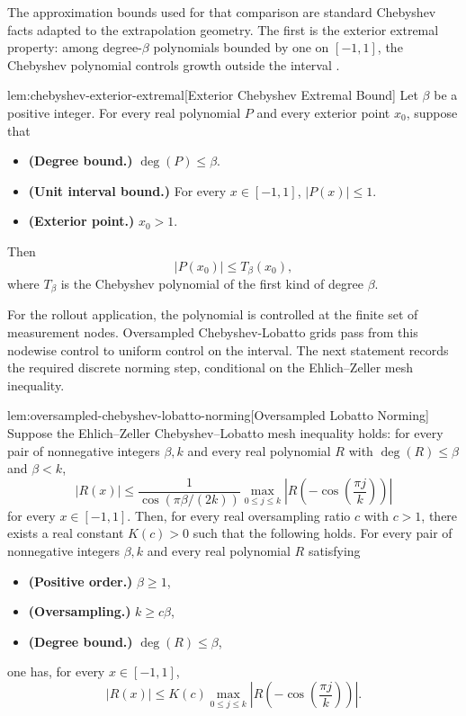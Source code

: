The approximation bounds used for that comparison are standard Chebyshev facts adapted to the extrapolation geometry. The first is the exterior extremal property: among degree-\(\beta\) polynomials bounded by one on \([-1,1]\), the Chebyshev polynomial controls growth outside the interval \citep{karlin1966,pukelsheim1993}.

\begin{lemmav}{lem:chebyshev-exterior-extremal}[Exterior Chebyshev Extremal Bound]
Let $\beta$ be a positive integer. For every real polynomial $P$ and every exterior point $x_0$, suppose that
\begin{itemize}
\item \textbf{(Degree bound.)} $\deg(P)\le \beta$.
\item \textbf{(Unit interval bound.)} For every $x\in[-1,1]$, $|P(x)|\le 1$.
\item \textbf{(Exterior point.)} $x_0>1$.
\end{itemize}
Then
\[
|P(x_0)|\le T_\beta(x_0),
\]
where $T_\beta$ is the Chebyshev polynomial of the first kind of degree $\beta$.
\end{lemmav}

For the rollout application, the polynomial is controlled at the finite set of measurement nodes. Oversampled Chebyshev-Lobatto grids pass from this nodewise control to uniform control on the interval. The next statement records the required discrete norming step, conditional on the Ehlich--Zeller mesh inequality.

\begin{lemmav}{lem:oversampled-chebyshev-lobatto-norming}[Oversampled Lobatto Norming]
Suppose the Ehlich--Zeller Chebyshev--Lobatto mesh inequality holds: for every pair of nonnegative integers $\beta,k$ and every real polynomial $R$ with $\deg(R)\le \beta$ and $\beta<k$,
\[
 |R(x)|
 \le
 \frac{1}{\cos(\pi\beta/(2k))}
 \max_{0\le j\le k}\left|R\!\left(-\cos\!\left(\frac{\pi j}{k}\right)\right)\right|
\]
for every $x\in[-1,1]$.  Then, for every real oversampling ratio $c$ with $c>1$, there exists a real constant $K(c)>0$ such that the following holds.  For every pair of nonnegative integers $\beta,k$ and every real polynomial $R$ satisfying
\begin{itemize}
\item \textbf{(Positive order.)} $\beta\ge 1$,
\item \textbf{(Oversampling.)} $k\ge c\beta$,
\item \textbf{(Degree bound.)} $\deg(R)\le \beta$,
\end{itemize}
one has, for every $x\in[-1,1]$,
\[
 |R(x)|
 \le
 K(c)
 \max_{0\le j\le k}\left|R\!\left(-\cos\!\left(\frac{\pi j}{k}\right)\right)\right|.
\]
\end{lemmav}

